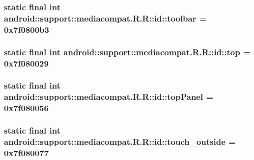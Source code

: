 \hypertarget{classandroid_1_1support_1_1mediacompat_1_1_r_1_1id_ef6267d3cf11c1387e2732ae8d1f5d1e}{
\subsubsection[{toolbar}]{\setlength{\rightskip}{0pt plus 5cm}static final int android::support::mediacompat.R.R::id::toolbar = 0x7f0800b3}}
\label{classandroid_1_1support_1_1mediacompat_1_1_r_1_1id_ef6267d3cf11c1387e2732ae8d1f5d1e}


\hypertarget{classandroid_1_1support_1_1mediacompat_1_1_r_1_1id_bd3bda2e3d331d31daabca7aea1ff1d4}{
\subsubsection[{top}]{\setlength{\rightskip}{0pt plus 5cm}static final int android::support::mediacompat.R.R::id::top = 0x7f080029}}
\label{classandroid_1_1support_1_1mediacompat_1_1_r_1_1id_bd3bda2e3d331d31daabca7aea1ff1d4}


\hypertarget{classandroid_1_1support_1_1mediacompat_1_1_r_1_1id_b48c9f958f7267b59e291f45238d60c0}{
\subsubsection[{topPanel}]{\setlength{\rightskip}{0pt plus 5cm}static final int android::support::mediacompat.R.R::id::topPanel = 0x7f080056}}
\label{classandroid_1_1support_1_1mediacompat_1_1_r_1_1id_b48c9f958f7267b59e291f45238d60c0}


\hypertarget{classandroid_1_1support_1_1mediacompat_1_1_r_1_1id_afaf468722de8777acc5b01c8e3e47e5}{
\subsubsection[{touch\_\-outside}]{\setlength{\rightskip}{0pt plus 5cm}static final int android::support::mediacompat.R.R::id::touch\_\-outside = 0x7f080077}}
\label{classandroid_1_1support_1_1mediacompat_1_1_r_1_1id_afaf468722de8777acc5b01c8e3e47e5}


